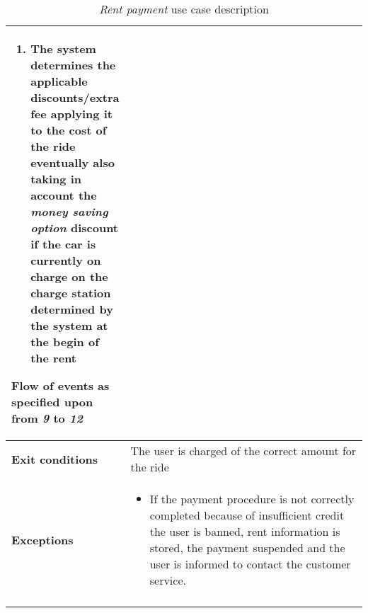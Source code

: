 \begin{longtable}{p{0.25\linewidth}p{0.75\linewidth}}
\begin{enumerate}[label=8 \alph*.]
	\item The system determines the applicable discounts/extra fee applying it to the cost of the ride eventually also taking in account the \emph{money saving option} discount if the car is currently on charge on the charge station determined by the system at the begin of the rent
\end{enumerate}
Flow of events as specified upon from \emph{9} to \emph{12} \\
\midrule
\textbf{Exit conditions} & 
The user is charged of the correct amount for the ride\\
\midrule
\textbf{Exceptions} & 
\begin{itemize}
	\item If the payment procedure is not correctly completed because of insufficient credit the user is banned, rent information is stored, the payment suspended and the user is informed to contact the customer service.  
\end{itemize} \\
\bottomrule
\caption{\emph{Rent payment} use case description}
\end{longtable}

\clearpage
